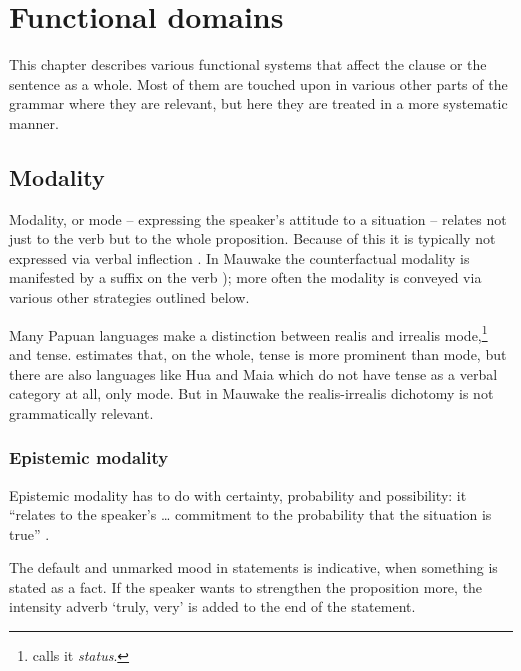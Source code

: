 
\chapter{Functional domains}

This chapter describes various functional systems that affect the clause or the sentence as a whole.  Most of them are touched upon in various other parts of the grammar where they are relevant, but here they are treated in a more systematic manner.

\section{Modality} \label{sec:6.1}

Modality, or mode -- expressing the speaker's attitude to a situation -- relates not just to the verb but to the whole proposition. Because of this it is typically not expressed via verbal inflection \citep[22]{Bybee1985}.  In Mauwake the counterfactual modality is manifested by a suffix on the verb 
); more often the modality is conveyed via various other strategies outlined below.

Many Papuan languages make a distinction between realis and irrealis mode,\footnote{\citet[158]{Foley1986} calls it \textit{status}.} and tense. \citet[162]{Foley1986} estimates that, on the whole, tense is more prominent than mode, but there are also languages like Hua \citep{Haiman1980} and Maia \citep{Hardin2002} which do not have tense as a verbal category at all, only mode. But in Mauwake the realis-irrealis dichotomy is not grammatically relevant. 

\subsection{Epistemic modality}

Epistemic modality has to do with certainty, probability and possibility: it ``relates to the speaker's {\dots} commitment to the probability that the situation is true'' \citep[234]{Payne1997}.  

The default  and unmarked mood in statements is indicative, when something is stated as a fact. If the speaker wants to strengthen the proposition more, the intensity adverb  `truly, very' is added to the end of the statement.

